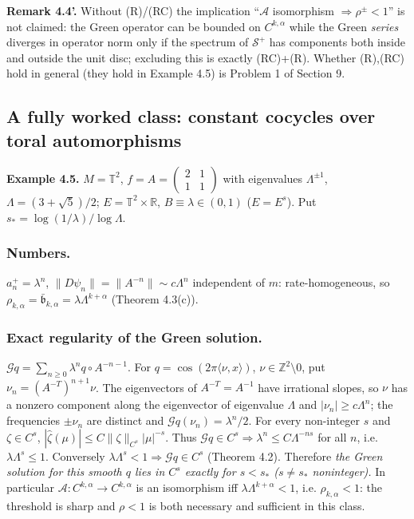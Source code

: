 \documentclass[11pt,a4paper]{article}
\theoremstyle{plain}
\theoremstyle{definition}
\theoremstyle{remark}
\numberwithin{equation}{section}
\numberwithin{figure}{section}
\begin{document}
\textbf{Remark 4.4'.} Without (R)/(RC) the implication ``$\mathcal A$ isomorphism $\Rightarrow\rho^\pm<1$'' is not claimed: the Green operator can be bounded on $C^{k,\alpha}$ while the Green \textit{series} diverges in operator norm only if the spectrum of $\mathcal S^+$ has components both inside and outside the unit disc; excluding this is exactly (RC)+(R). Whether (R),(RC) hold in general (they hold in Example 4.5) is Problem 1 of Section 9.

\subsection{A fully worked class: constant cocycles over toral automorphisms}

\textbf{Example 4.5.} $M=\mathbb T^2$, $f=A=\begin{pmatrix}2&1\\1&1\end{pmatrix}$ with eigenvalues $\Lambda^{\pm1}$, $\Lambda=(3+\sqrt5)/2$; $E=\mathbb T^2\times\mathbb R$, $B\equiv\lambda\in(0,1)$ ($E=E^s$). Put $s_*=\log(1/\lambda)/\log\Lambda$.

\subsubsection{Numbers.} $a^+_n=\lambda^n$, $\|D\psi_n\|=\|A^{-n}\|\sim c\Lambda^n$ independent of $m$: rate-homogeneous, so $\rho_{k,\alpha}=\bar{\mathfrak b}_{k,\alpha}=\lambda\Lambda^{k+\alpha}$ (Theorem 4.3(c)).

\subsubsection{Exact regularity of the Green solution.} $\mathcal Gq=\sum_{n\ge0}\lambda^nq\circ A^{-n-1}$. For $q=\cos(2\pi\langle\nu,x\rangle)$, $\nu\in\mathbb Z^2\setminus0$, put $\nu_n=(A^{-T})^{n+1}\nu$. The eigenvectors of $A^{-T}=A^{-1}$ have irrational slopes, so $\nu$ has a nonzero component along the eigenvector of eigenvalue $\Lambda$ and $|\nu_n|\ge c\Lambda^n$; the frequencies $\pm\nu_n$ are distinct and $\widehat{\mathcal Gq}(\nu_n)=\lambda^n/2$. For every non-integer $s$ and $\zeta\in C^s$, $|\hat\zeta(\mu)|\le C\|\zeta\|_{C^s}|\mu|^{-s}$. Thus $\mathcal Gq\in C^s\Rightarrow\lambda^n\le C\Lambda^{-ns}$ for all $n$, i.e. $\lambda\Lambda^s\le1$. Conversely $\lambda\Lambda^s<1\Rightarrow\mathcal Gq\in C^s$ (Theorem 4.2). Therefore \textit{the Green solution for this smooth $q$ lies in $C^s$ exactly for $s<s_*$ ($s\ne s_*$ noninteger).} In particular $\mathcal A:C^{k,\alpha}\to C^{k,\alpha}$ is an isomorphism iff $\lambda\Lambda^{k+\alpha}<1$, i.e. $\rho_{k,\alpha}<1$: the threshold is sharp and $\rho<1$ is both necessary and sufficient in this class.
\end{document}
